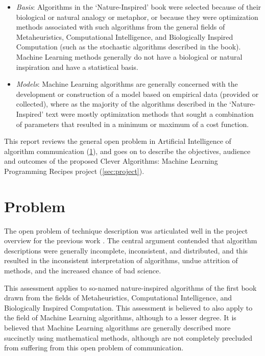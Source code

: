 \documentclass[a4paper, 11pt]{article}
\begin{document}
\begin{itemize}
	\item \emph{Basis}: Algorithms in the `Nature-Inspired' book were selected because of their biological or natural analogy or metaphor, or because they were optimization methods associated with such algorithms from the general fields of Metaheuristics, Computational Intelligence, and Biologically Inspired Computation (such as the stochastic algorithms described in the book). Machine Learning methods generally do not have a biological or natural inspiration and have a statistical basis.
	\item \emph{Models}: Machine Learning algorithms are generally concerned with the development or construction of a model based on empirical data (provided or collected), where as the majority of the algorithms described in the `Nature-Inspired' text were mostly optimization methods that sought a combination of parameters that resulted in a minimum or maximum of a cost function.
\end{itemize}

This report reviews the general open problem in Artificial Intelligence of algorithm communication (\ref{sec:problem}), and goes on to describe the objectives, audience and outcomes of the proposed Clever Algorithms: Machine Learning Programming Recipes project (\ref{sec:project}).

\section{Problem}
\label{sec:problem}
The open problem of technique description was articulated well in the project overview for the previous work \cite{Brownlee2010}. The central argument contended that algorithm descriptions were generally incomplete, inconsistent, and distributed, and this resulted in the inconsistent interpretation of algorithms, undue attrition of methods, and the increased chance of bad science. 

This assessment applies to so-named nature-inspired algorithms of the first book drawn from the fields of Metaheuristics, Computational Intelligence, and Biologically Inspired Computation. This assessment is believed to also apply to the field of Machine Learning algorithms, although to a lesser degree. It is believed that Machine Learning algorithms are generally described more succinctly using mathematical methods, although are not completely precluded from suffering from this open problem of communication.
\end{document}
